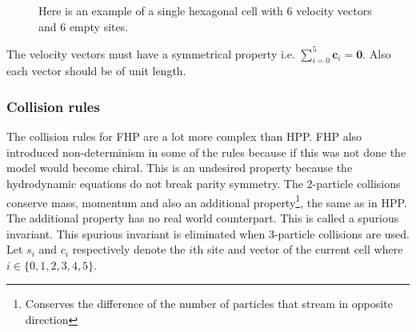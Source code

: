 \documentclass[a4paper,12pt]{article}
\begin{document}
\begin{figure}[H]
  \caption{Here is an example of a single hexagonal cell with 6 velocity vectors and 6 empty sites.}
  \label{figure:Hsingle-cell}
\end{figure}
\noindent The velocity vectors must have a symmetrical property i.e. $\sum_{i = 0}^{5} \textbf{c}_{i} = \textbf{0}$. Also each vector should be of unit length.
\subsubsection{Collision rules}
The collision rules for FHP are a lot more complex than HPP. FHP also introduced non-determinism in some of the rules because if this was not done the model would become chiral. This is an undesired property because the hydrodynamic equations do not break parity symmetry.
The 2-particle collisions conserve mass, momentum and also an additional property\footnote{Conserves the difference of the number of particles that stream in opposite direction}, the same as in HPP. The additional property has no real world counterpart. This is called a spurious invariant. This spurious invariant is eliminated when 3-particle collisions
are used. Let $s_{i}$ and $c_{i}$ respectively denote the $i$th site and vector of the current cell where $i \in \{0, 1, 2, 3, 4, 5\}$. 
\end{document}
